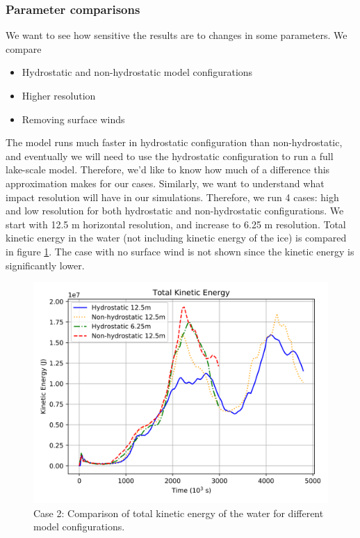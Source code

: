 \documentclass[11pt]{article}
\begin{document}
\subsubsection*{Parameter comparisons}
We want to see how sensitive the results are to changes in some parameters. We compare
\begin{itemize}
\item{Hydrostatic and non-hydrostatic model configurations}
\item{Higher resolution}
\item{Removing surface winds}
\end{itemize}
The model runs much faster in hydrostatic configuration than non-hydrostatic, and eventually we will need to use the hydrostatic configuration to run a full lake-scale model. Therefore, we'd like to know how much of a difference this approximation makes for our cases. Similarly, we want to understand what impact resolution will have in our simulations. Therefore, we run 4 cases: high and low resolution for both hydrostatic and non-hydrostatic configurations. We start with 12.5 m horizontal resolution, and increase to 6.25 m resolution. Total kinetic energy in the water (not including kinetic energy of the ice) is compared in figure \ref{fig:iceMeltCompareTKE}. The case with no surface wind is not shown since the kinetic energy is significantly lower.

\begin{figure}[h!]
\centering
\includegraphics[width=0.85\linewidth]{iceMelt/icemeltsmooth-deltaTKE}
\caption{Case 2: Comparison of total kinetic energy of the water for different model configurations.}
\label{fig:iceMeltCompareTKE}
\end{figure}
\end{document}
